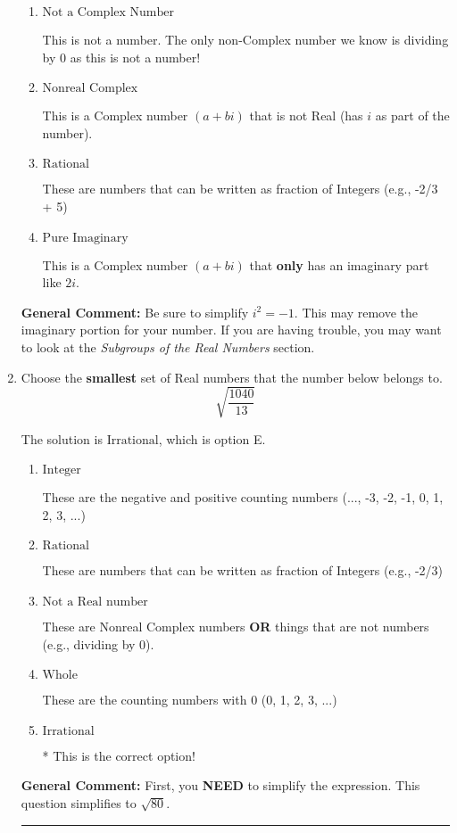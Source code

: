 \documentclass{extbook}[14pt]
\newcommand{\litem}[1]{\item #1

\rule{\textwidth}{0.4pt}}
\begin{document}
\begin{enumerate}
{\begin{enumerate}[label=\Alph*.]
* This is the correct option!
\item \( \text{Not a Complex Number} \)

This is not a number. The only non-Complex number we know is dividing by 0 as this is not a number!
\item \( \text{Nonreal Complex} \)

This is a Complex number $(a+bi)$ that is not Real (has $i$ as part of the number).
\item \( \text{Rational} \)

These are numbers that can be written as fraction of Integers (e.g., -2/3 + 5)
\item \( \text{Pure Imaginary} \)

This is a Complex number $(a+bi)$ that \textbf{only} has an imaginary part like $2i$.
\end{enumerate}

\textbf{General Comment:} Be sure to simplify $i^2 = -1$. This may remove the imaginary portion for your number. If you are having trouble, you may want to look at the \textit{Subgroups of the Real Numbers} section.
}
\litem{
Choose the \textbf{smallest} set of Real numbers that the number below belongs to.
\[ \sqrt{\frac{1040}{13}} \]

The solution is \( \text{Irrational} \), which is option E.\begin{enumerate}[label=\Alph*.]
\item \( \text{Integer} \)

These are the negative and positive counting numbers (..., -3, -2, -1, 0, 1, 2, 3, ...)
\item \( \text{Rational} \)

These are numbers that can be written as fraction of Integers (e.g., -2/3)
\item \( \text{Not a Real number} \)

These are Nonreal Complex numbers \textbf{OR} things that are not numbers (e.g., dividing by 0).
\item \( \text{Whole} \)

These are the counting numbers with 0 (0, 1, 2, 3, ...)
\item \( \text{Irrational} \)

* This is the correct option!
\end{enumerate}

\textbf{General Comment:} First, you \textbf{NEED} to simplify the expression. This question simplifies to $\sqrt{80}$. 
 
}
\end{enumerate}
\end{document}
